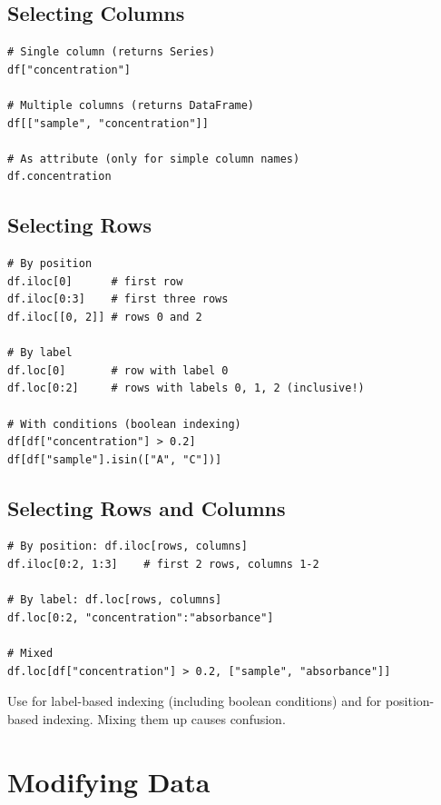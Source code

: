 \subsection{Selecting Columns}

\begin{lstlisting}
# Single column (returns Series)
df["concentration"]

# Multiple columns (returns DataFrame)
df[["sample", "concentration"]]

# As attribute (only for simple column names)
df.concentration
\end{lstlisting}

\subsection{Selecting Rows}

\begin{lstlisting}
# By position
df.iloc[0]      # first row
df.iloc[0:3]    # first three rows
df.iloc[[0, 2]] # rows 0 and 2

# By label
df.loc[0]       # row with label 0
df.loc[0:2]     # rows with labels 0, 1, 2 (inclusive!)

# With conditions (boolean indexing)
df[df["concentration"] > 0.2]
df[df["sample"].isin(["A", "C"])]
\end{lstlisting}

\subsection{Selecting Rows and Columns}

\begin{lstlisting}
# By position: df.iloc[rows, columns]
df.iloc[0:2, 1:3]    # first 2 rows, columns 1-2

# By label: df.loc[rows, columns]
df.loc[0:2, "concentration":"absorbance"]

# Mixed
df.loc[df["concentration"] > 0.2, ["sample", "absorbance"]]
\end{lstlisting}

\begin{tip}
Use  for label-based indexing (including boolean conditions) and  for position-based indexing. Mixing them up causes confusion.
\end{tip}

\section{Modifying Data}
\label{sec:modifying}

